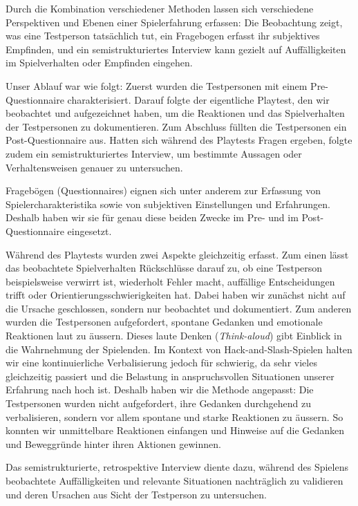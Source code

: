 \documentclass[../Main.tex]{subfiles}
\begin{document}
Durch die Kombination verschiedener Methoden lassen sich verschiedene Perspektiven und Ebenen einer Spielerfahrung erfassen: Die Beobachtung zeigt, was eine Testperson tatsächlich tut, ein Fragebogen erfasst ihr subjektives Empfinden, und ein semistrukturiertes Interview kann gezielt auf Auffälligkeiten im Spielverhalten oder Empfinden eingehen.\autocite[112]{drachen2018gamesuserresearch}

Unser Ablauf war wie folgt: Zuerst wurden die Testpersonen mit einem Pre-Questionnaire charakterisiert. Darauf folgte der eigentliche Playtest, den wir beobachtet und aufgezeichnet haben, um die Reaktionen und das Spielverhalten der Testpersonen zu dokumentieren. Zum Abschluss füllten die Testpersonen ein Post-Questionnaire aus. Hatten sich während des Playtests Fragen ergeben, folgte zudem ein semistrukturiertes Interview, um bestimmte Aussagen oder Verhaltensweisen genauer zu untersuchen.

Fragebögen (Questionnaires) eignen sich unter anderem zur Erfassung von Spielercharakteristika sowie von subjektiven Einstellungen und Erfahrungen.\autocite[142--143]{drachen2018gamesuserresearch} Deshalb haben wir sie für genau diese beiden Zwecke im Pre- und im Post-Questionnaire eingesetzt.

Während des Playtests wurden zwei Aspekte gleichzeitig erfasst. Zum einen lässt das beobachtete Spielverhalten Rückschlüsse darauf zu, ob eine Testperson beispielsweise verwirrt ist, wiederholt Fehler macht, auffällige Entscheidungen trifft oder Orientierungsschwierigkeiten hat. Dabei haben wir zunächst nicht auf die Ursache geschlossen, sondern nur beobachtet und dokumentiert. Zum anderen wurden die Testpersonen aufgefordert, spontane Gedanken und emotionale Reaktionen laut zu äussern. Dieses laute Denken (\textit{Think-aloud}) gibt Einblick in die Wahrnehmung der Spielenden.\autocite[189--190]{drachen2018gamesuserresearch} Im Kontext von Hack-and-Slash-Spielen halten wir eine kontinuierliche Verbalisierung jedoch für schwierig, da sehr vieles gleichzeitig passiert und die Belastung in anspruchsvollen Situationen unserer Erfahrung nach hoch ist. Deshalb haben wir die Methode angepasst: Die Testpersonen wurden nicht aufgefordert, ihre Gedanken durchgehend zu verbalisieren, sondern vor allem spontane und starke Reaktionen zu äussern. So konnten wir unmittelbare Reaktionen einfangen und Hinweise auf die Gedanken und Beweggründe hinter ihren Aktionen gewinnen.

Das semistrukturierte, retrospektive Interview diente dazu, während des Spielens beobachtete Auffälligkeiten und relevante Situationen nachträglich zu validieren und deren Ursachen aus Sicht der Testperson zu untersuchen.\autocite[164--167]{drachen2018gamesuserresearch}
\end{document}
